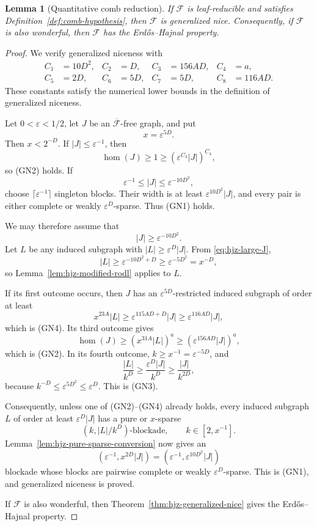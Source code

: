 \documentclass[11pt]{article}
\numberwithin{equation}{section}
\theoremstyle{plain}
\newtheorem{lemma}[theorem]{Lemma}
\theoremstyle{definition}
\begin{document}
\begin{lemma}[Quantitative comb reduction]
\label{lem:hjz-poly-length}
If $\mathcal F$ is leaf-reducible and satisfies
Definition~\ref{def:comb-hypothesis}, then $\mathcal F$ is
generalized nice.  Consequently, if $\mathcal F$ is also wonderful,
then $\mathcal F$ has the Erd\H{o}s--Hajnal property.
\end{lemma}

\begin{proof}
We verify generalized niceness with
\begin{align*}
 C_1&=10D^2,& C_2&=D,& C_3&=156AD,& C_4&=a,\\
 C_5&=2D,& C_6&=5D,& C_7&=5D,& C_8&=116AD.
\end{align*}
These constants satisfy the numerical lower bounds in the definition
of generalized niceness.

Let $0<\varepsilon<1/2$, let $J$ be an
$\overline{\mathcal F}$-free graph, and put
\[
                              x=\varepsilon^{5D}.
\]
Then $x<2^{-D}$.  If $|J|\leq\varepsilon^{-1}$, then
\[
       \operatorname{hom}(J)\geq1
          \geq(\varepsilon^{C_3}|J|)^{C_4},
\]
so (GN2) holds.  If
\[
       \varepsilon^{-1}\leq|J|
             \leq\varepsilon^{-10D^2},
\]
choose $\lceil\varepsilon^{-1}\rceil$ singleton blocks.  Their width is
at least $\varepsilon^{10D^2}|J|$, and every pair is either complete
or weakly $\varepsilon^D$-sparse.  Thus (GN1) holds.

We may therefore assume that
\begin{equation}
                             |J|\geq\varepsilon^{-10D^2}.
\label{eq:hjz-large-J}
\end{equation}
Let $L$ be any induced subgraph with
$|L|\geq\varepsilon^D|J|$.  From
\eqref{eq:hjz-large-J},
\[
 |L|\geq\varepsilon^{-10D^2+D}
          \geq\varepsilon^{-5D^2}=x^{-D},
\]
so Lemma~\ref{lem:hjz-modified-rodl} applies to $L$.

If its first outcome occurs, then $J$ has an
$\varepsilon^{5D}$-restricted induced subgraph of order at least
\[
 x^{23A}|L|
    \geq\varepsilon^{115AD+D}|J|
    \geq\varepsilon^{116AD}|J|,
\]
which is (GN4).  Its third outcome gives
\[
 \operatorname{hom}(J)
      \geq(x^{31A}|L|)^a
      \geq(\varepsilon^{156AD}|J|)^a,
\]
which is (GN2).  In its fourth outcome,
$k\geq x^{-1}=\varepsilon^{-5D}$, and
\[
 \frac{|L|}{k^D}
       \geq\frac{\varepsilon^D|J|}{k^D}
       \geq\frac{|J|}{k^{2D}},
\]
because
$k^{-D}\leq\varepsilon^{5D^2}\leq\varepsilon^D$.
This is (GN3).

Consequently, unless one of (GN2)--(GN4) already holds, every induced
subgraph $L$ of order at least $\varepsilon^D|J|$ has a pure or
$x$-sparse
\[
                 (k,|L|/k^D)\text{-blockade},
                 \qquad k\in[2,x^{-1}].
\]
Lemma~\ref{lem:hjz-pure-sparse-conversion} now gives an
\[
  (\varepsilon^{-1},x^{2D}|J|)
   =(\varepsilon^{-1},\varepsilon^{10D^2}|J|)
\]
blockade whose blocks are pairwise complete or weakly
$\varepsilon^D$-sparse.  This is (GN1), and generalized niceness is
proved.

If $\mathcal F$ is also wonderful, then
Theorem~\ref{thm:hjz-generalized-nice} gives the
Erd\H{o}s--Hajnal property.
\end{proof}
\end{document}
